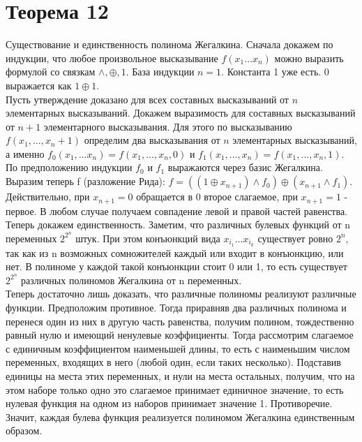 \documentclass[12pt,a4paper]{scrartcl}
\newcommand*\xor{\mathbin{\oplus}}
\begin{document}
\section*{Теорема 12}
Существование и единственность полинома Жегалкина.
Сначала докажем по индукции, что любое произвольное высказывание $f(x_1 \ldots x_n)$
можно выразить формулой со связкам $\wedge, \xor, 1$. База индукции $n = 1$.
Константа 1 уже есть. 0 выражается как $1 \xor 1$. \\
Пусть утверждение доказано для всех составных высказываний от $n$ элементарных
высказываний. Докажем выразимость для составных высказываний от $n + 1$ элементарного
высказывания. Для этого по высказыванию $f(x_1, \ldots , x_n+1)$ определим
два высказывания от $n$ элементарных высказываний, а именно $f_0(x_1, \ldots x_n) =
f(x_1, \ldots , x_n, 0) $ и $f_1(x_1, \ldots , x_n) = f(x_1, \ldots , x_n, 1)$.
По предположению индукции $f_0$ и $f_1$ выражаются через базис Жегалкина. Выразим
теперь f (разложение Рида): $f = ((1 \xor x_{n+1}) \wedge f_0) \xor (x_{n+1} \wedge f_1)$.
Действительно, при $x_{n+1} = 0$ обращается в 0 второе слагаемое, при $x_{n+1} = 1$ -
первое. В любом случае получаем совпадение левой и правой частей равенства.
\\
Теперь докажем единственность.
Заметим, что различных булевых функций от n переменных $2^{2^n}$ штук.
При этом конъюнкций вида $x_{i_1} \ldots x_{i_k}$ существует ровно $2^n$, так как из
n возможных сомножителей каждый или входит в конъюнкцию, или нет. В полиноме у
каждой такой конъюнкции стоит 0 или 1, то есть существует $2^{2^n}$ различных
полиномов Жегалкина от n переменных.\\
Теперь достаточно лишь доказать, что различные полиномы реализуют различные функции.
Предположим противное. Тогда приравняв два различных полинома и перенеся один из них
в другую часть равенства, получим полином, тождественно равный нулю и имеющий ненулевые
коэффициенты. Тогда рассмотрим слагаемое с единичным коэффициентом наименьшей длины,
то есть с наименьшим числом переменных, входящих в него (любой один, если таких несколько).
Подставив единицы на места этих переменных, и нули на места остальных, получим,
что на этом наборе только одно это слагаемое принимает единичное значение, то
есть нулевая функция на одном из наборов принимает значение 1. Противоречие.
Значит, каждая булева функция реализуется полиномом Жегалкина единственным образом.
\end{document}

